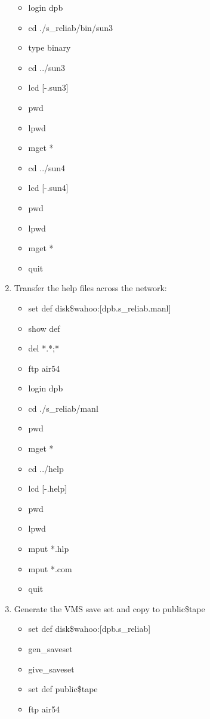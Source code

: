 \begin{enumerate}
\begin{itemize}
      \item login dpb
      \item cd ./s\_reliab/bin/sun3
      \item type binary
      \item cd ../sun3
      \item lcd [-.sun3]
      \item pwd
      \item lpwd
      \item mget *
      \item cd ../sun4
      \item lcd [-.sun4]
      \item pwd
      \item lpwd
      \item mget *
      \item quit
      \end{itemize}
   \item Transfer the help files across the network:
      \begin{itemize}
      \item set def disk\$wahoo:[dpb.s\_reliab.manl]
      \item show def
      \item del *.*;*
      \item ftp air54
      \item login dpb
      \item cd ./s\_reliab/manl
      \item pwd
      \item mget *
      \item cd ../help
      \item lcd [-.help]
      \item pwd
      \item lpwd
      \item mput *.hlp
      \item mput *.com
      \item quit
      \end{itemize}
   \item Generate the VMS save set and copy to public\$tape 
      \begin{itemize}
      \item set def disk\$wahoo:[dpb.s\_reliab]
      \item {\atsign}gen\_saveset
      \item {\atsign}give\_saveset
      \item set def public\$tape
      \item ftp air54

\end{itemize}
\end{enumerate}
